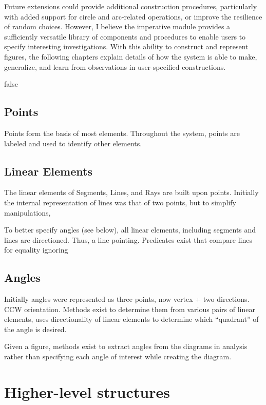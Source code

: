 Future extensions could provide additional construction procedures,
particularly with added support for circle and arc-related operations,
or improve the resilience of random choices. However, I believe the
imperative module provides a sufficiently versatile library of
components and procedures to enable users to specify interesting
investigations. With this ability to construct and represent figures,
the following chapters explain details of how the system is able to
make, generalize, and learn from observations in user-specified
constructions.



\if false

\subsection{Points}

Points form the basis of most elements. Throughout the system, points
are labeled and used to identify other elements.

\subsection{Linear Elements}

The linear elements of Segments, Lines, and Rays are built upon
points. Initially the internal representation of lines was that of two
points, but to simplify manipulations,

To better specify angles (see below), all linear elements, including
segments and lines are directioned. Thus, a line pointing. Predicates
exist that compare lines for equality ignoring

\subsection{Angles}

Initially angles were represented as three points, now vertex + two
directions. CCW orientation. Methods exist to determine them from
various pairs of linear elements, uses directionality of linear
elements to determine which ``quadrant'' of the angle is desired.

Given a figure, methods exist to extract angles from the diagrams in
analysis rather than specifying each angle of interest while creating
the diagram.

\section{Higher-level structures}


